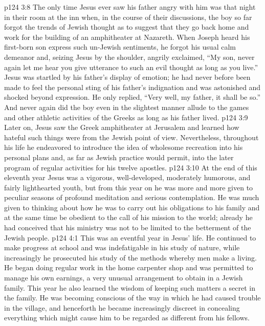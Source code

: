 \vs p124 3:8 The only time Jesus ever saw his father angry with him was that night in their room at the inn when, in the course of their discussions, the boy so far forgot the trends of Jewish thought as to suggest that they go back home and work for the building of an amphitheater at Nazareth. When Joseph heard his first\hyp{}born son express such un\hyp{}Jewish sentiments, he forgot his usual calm demeanor and, seizing Jesus by the shoulder, angrily exclaimed, “My son, never again let me hear you give utterance to such an evil thought as long as you live.” Jesus was startled by his father’s display of emotion; he had never before been made to feel the personal sting of his father’s indignation and was astonished and shocked beyond expression. He only replied, \textcolor{ubdarkred}{“Very well, my father, it shall be so.”} And never again did the boy even in the slightest manner allude to the games and other athletic activities of the Greeks as long as his father lived.\plusone
\vs p124 3:9 Later on, Jesus saw the Greek amphitheater at Jerusalem and learned how hateful such things were from the Jewish point of view. Nevertheless, throughout his life he endeavored to introduce the idea of wholesome recreation into his personal plans and, as far as Jewish practice would permit, into the later program of regular activities for his twelve apostles.
\vs p124 3:10 At the end of this eleventh year Jesus was a vigorous, well\hyp{}developed, moderately humorous, and fairly lighthearted youth, but from this year on he was more and more given to peculiar seasons of profound meditation and serious contemplation. He was much given to thinking about how he was to carry out his obligations to his family and at the same time be obedient to the call of his mission to the world; already he had conceived that his ministry was not to be limited to the betterment of the Jewish people.
\vs p124 4:1 This was an eventful year in Jesus’ life. He continued to make progress at school and was indefatigable in his study of nature, while increasingly he prosecuted his study of the methods whereby men make a living. He began doing regular work in the home carpenter shop and was permitted to manage his own earnings, a very unusual arrangement to obtain in a Jewish family. This year he also learned the wisdom of keeping such matters a secret in the family. He was becoming conscious of the way in which he had caused trouble in the village, and henceforth he became increasingly discreet in concealing everything which might cause him to be regarded as different from his fellows.
